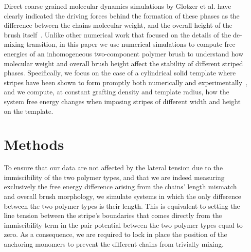 Direct coarse grained molecular dynamics simulations by Glotzer et al. have clearly indicated  
the driving forces behind the formation of these phases as the difference between the chains molecular weight, and the overall 
height of the brush itself~\cite{Stellacci2,Stellacci4,Stellacci5,Glz1,Stellacci6}. Unlike other numerical work that focused on the details of the de-mixing transition,   
in this paper we use numerical simulations to compute free energies of an  
inhomogeneous two-component polymer brush to understand how molecular weight and overall brush  height
affect the stability of different striped phases. 
Specifically, we focus on the case of a cylindrical solid template where stripes have been shown to form
promptly both numerically and experimentally~\cite{Stellacci6,Stellacci5}, and we compute, at constant grafting density  
and template radius, how the system free energy changes when imposing stripes of different width and height on the template.

\section{Methods}

To ensure that our data are not  affected by the lateral tension due to the 
immiscibility of  the two polymer types, and that we are indeed measuring exclusively 
the free energy difference arising from the chains' length mismatch and overall brush morphology, 
we simulate systems in which the only difference between the two polymer types is their length. 
This is equivalent to setting the  line tension between 
the stripe's boundaries that comes directly from the immiscibility term in the pair 
potential between the two polymer types equal to zero.
As a consequence, we are required to lock in place the position of the anchoring monomers to prevent the different chains from trivially mixing. 
 
